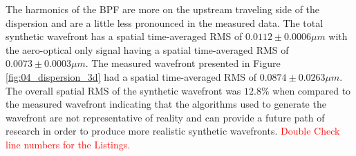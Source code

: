 The harmonics of the BPF are more on the upstream traveling side of the dispersion and are a little less pronounced in the measured data.
The total synthetic wavefront has a spatial time-averaged RMS of $0.0112\pm0.0006\mu m$ with the aero-optical only signal having a spatial time-averaged RMS of $0.0073\pm0.0003\mu m$.
The measured wavefront presented in Figure \ref{fig:04_dispersion_3d} had a spatial time-averaged RMS of $0.0874\pm0.0263\mu m$.
The overall spatial RMS of the synthetic wavefront was $12.8\%$ when compared to the measured wavefront indicating that the algorithms used to generate the wavefront are not representative of reality and can provide a future path of research in order to produce more realistic synthetic wavefronts.
\textcolor{red}{Double Check line numbers for the Listings.}
